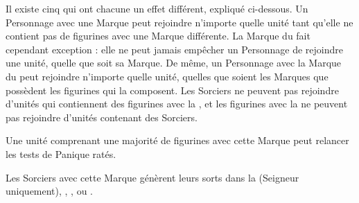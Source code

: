 \newcommand{\thumprule}{%
Choisissez une figurine en contact socle à socle avec le Géant dans l'unité sélectionnée. Cette figurine doit faire un test d'Initiative. Si elle échoue, la figurine subit 2D6 blessures avec la règle \armourpiercing{6}.
}

\newcommand{\smashrule}{%
Choisissez une figurine en contact socle à socle avec le Géant dans l'unité sélectionnée. Cette figurine subit une blessure avec la règle \armourpiercing{6}. Si la figurine n'a pas encore attaqué, elle ne peut plus le faire au cours de cette manche. Si la figurine a déjà réalisé ses attaques, elle ne pourra pas attaquer au cours du tour de  joueur à venir.
}



\newcommand{\QRSnote}{%
\noindent\refsymbol{} Un membre d'équipage de moins en tant que monture.
}












\startarmyspecialrules

\armyspecialruleentry{\marksofthedarkgods}

Il existe cinq \marksofthedarkgods{} qui ont chacune un effet différent, expliqué ci-dessous. Un Personnage avec une Marque peut rejoindre n'importe quelle unité tant qu'elle ne contient pas de figurines avec une Marque différente. La Marque du \truechaos{} fait cependant exception : elle ne peut jamais empêcher un Personnage de rejoindre une unité, quelle que soit sa Marque. De même, un Personnage avec la Marque du \truechaos{} peut rejoindre n'importe quelle unité, quelles que soient les Marques que possèdent les figurines qui la composent. Les Sorciers ne peuvent pas rejoindre d'unités qui contiennent des figurines avec la \markofwrath{}, et les figurines avec la \markofwrath{} ne peuvent pas rejoindre d'unités contenant des Sorciers.

\spacebetweenmarks{}

\hfill\markstartsidetext{\markoftruechaos}
Une unité comprenant une majorité de figurines avec cette Marque peut relancer les tests de Panique ratés.

Les Sorciers avec cette Marque génèrent leurs sorts dans la \Pathof{} \heavens{} (Seigneur uniquement), \alchemy{}, \fire{}, \death{} ou \shadows{}.
\markclosesidetext{}

\spacebetweenmarks{}

